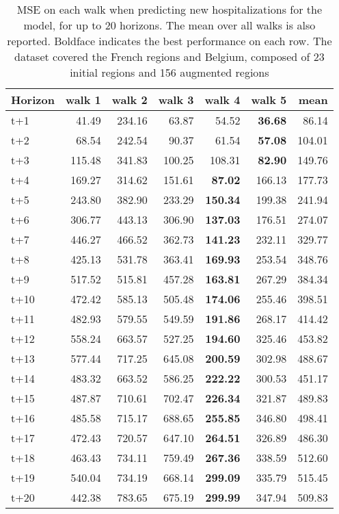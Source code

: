 \begin{table}[H]
\centering
\caption{MSE on each walk when predicting new hospitalizations for the model, for up to 20 horizons. The mean over all walks is also reported. Boldface indicates the best performance on each row. The dataset covered the French regions and Belgium, composed of 23 initial regions and 156 augmented regions }
\label{tab:MSE_walk_dense_model}
\begin{tabular}{lrrrrrr}
\toprule
Horizon &  walk 1 &  walk 2 &  walk 3 &  walk 4 &  walk 5 &   mean \\
\midrule
t+1  & 41.49  & 234.16  & 63.87  & 54.52  & \textbf{36.68}  & 86.14  \\
t+2  & 68.54  & 242.54  & 90.37  & 61.54  & \textbf{57.08}  & 104.01  \\
t+3  & 115.48  & 341.83  & 100.25  & 108.31  & \textbf{82.90}  & 149.76  \\
t+4  & 169.27  & 314.62  & 151.61  & \textbf{87.02}  & 166.13  & 177.73  \\
t+5  & 243.80  & 382.90  & 233.29  & \textbf{150.34}  & 199.38  & 241.94  \\
t+6  & 306.77  & 443.13  & 306.90  & \textbf{137.03}  & 176.51  & 274.07  \\
t+7  & 446.27  & 466.52  & 362.73  & \textbf{141.23}  & 232.11  & 329.77  \\
t+8  & 425.13  & 531.78  & 363.41  & \textbf{169.93}  & 253.54  & 348.76  \\
t+9  & 517.52  & 515.81  & 457.28  & \textbf{163.81}  & 267.29  & 384.34  \\
t+10  & 472.42  & 585.13  & 505.48  & \textbf{174.06}  & 255.46  & 398.51  \\
t+11  & 482.93  & 579.55  & 549.59  & \textbf{191.86}  & 268.17  & 414.42  \\
t+12  & 558.24  & 663.57  & 527.25  & \textbf{194.60}  & 325.46  & 453.82  \\
t+13  & 577.44  & 717.25  & 645.08  & \textbf{200.59}  & 302.98  & 488.67  \\
t+14  & 483.32  & 663.52  & 586.25  & \textbf{222.22}  & 300.53  & 451.17  \\
t+15  & 487.87  & 710.61  & 702.47  & \textbf{226.34}  & 321.87  & 489.83  \\
t+16  & 485.58  & 715.17  & 688.65  & \textbf{255.85}  & 346.80  & 498.41  \\
t+17  & 472.43  & 720.57  & 647.10  & \textbf{264.51}  & 326.89  & 486.30  \\
t+18  & 463.43  & 734.11  & 759.49  & \textbf{267.36}  & 338.59  & 512.60  \\
t+19  & 540.04  & 734.19  & 668.14  & \textbf{299.09}  & 335.79  & 515.45  \\
t+20  & 442.38  & 783.65  & 675.19  & \textbf{299.99}  & 347.94  & 509.83  \\

\bottomrule
\end{tabular}
\end{table}
